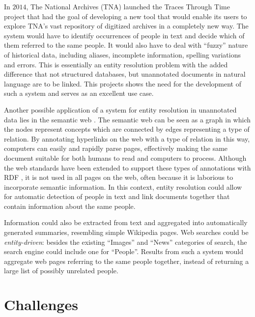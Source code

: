 In $2014$, The National Archives (TNA) launched the Traces Through Time project that had the goal of developing a new tool that would enable its users to explore TNA's vast repository of digitized archives in a completely new way.
The system would have to identify occurrences of people in text and decide which of them referred to the same people.
It would also have to deal with ``fuzzy'' nature of historical data, including aliases, incomplete information, spelling variations and errors.
This is essentially an entity resolution problem with the added difference that not structured databases, but unannotated documents in natural language are to be linked.
This projects shows the need for the development of such a system and serves as an excellent use case.

Another possible application of a system for entity resolution in unannotated data lies in the semantic web \citep{Berners2001, Mihalcea2007}.
The semantic web can be seen as a graph in which the nodes represent concepts which are connected by edges representing a type of relation.
By annotating hyperlinks on the web with a type of relation in this way, computers can easily and rapidly parse pages, effectively making the same document suitable for both humans to read and computers to process.
Although the web standards have been extended to support these types of annotations with RDF \citep{Pan2009}, it is not used in all pages on the web, often because it is laborious to incorporate semantic information.
In this context, entity resolution could allow for automatic detection of people in text and link documents together that contain information about the same people.

Information could also be extracted from text and aggregated into automatically generated summaries, resembling simple Wikipedia \citep{Wikipedia} pages.
Web searches could be \emph{entity-driven}: besides the existing ``Images'' and ``News'' categories of search, the search engine could include one for ``People''.
Results from such a system would aggregate web pages referring to the same people together, instead of returning a large list of possibly unrelated people.




\section{Challenges}
\label{sec:challenges}

